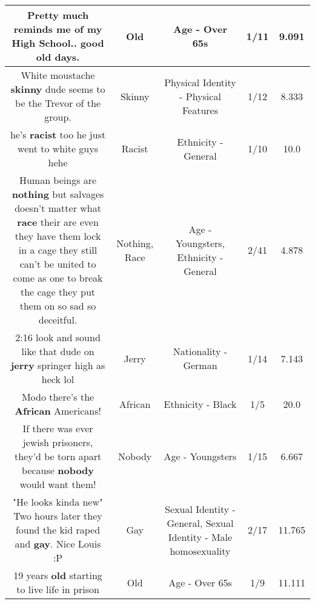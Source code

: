 \documentclass[11pt]{article}
\newlength\mylength
\begin{document}
\begin{center}
\begin{longtable}{|C{.65\mylength}|C{.30\mylength}|C{.12\mylength}|C{.12\mylength}|C{.12\mylength}|}
  \small Pretty much reminds me of my High School.. good \textbf{old} days.\normalsize   & Old & Age - Over 65s & 1/11 & 9.091 \\  \hline
  \small White moustache \textbf{skinny} dude seems to be the Trevor of the group.\normalsize   & Skinny & Physical Identity - Physical Features & 1/12 & 8.333 \\  \hline
  \small he's \textbf{racist} too he just went to white guys hehe\normalsize   & Racist & Ethnicity - General & 1/10 & 10.0 \\  \hline
  \small Human beings are \textbf{nothing} but salvages doesn't matter what \textbf{race} their are even they have them lock in a cage they still can't be united to come as one to break the cage they put them on so sad so deceitful.\normalsize   & Nothing, Race & Age - Youngsters, Ethnicity - General & 2/41 & 4.878 \\  \hline
  \small 2:16 look and sound like that dude on \textbf{jerry} springer high as heck lol\normalsize   & Jerry & Nationality - German & 1/14 & 7.143 \\  \hline
  \small Modo there's the \textbf{African} Americans!\normalsize   & African & Ethnicity - Black & 1/5 & 20.0 \\  \hline
  \small If there was ever jewish prisoners, they'd be torn apart because \textbf{nobody} would want them!\normalsize   & Nobody & Age - Youngsters & 1/15 & 6.667 \\  \hline
  \small "He looks kinda new" Two hours later they found the kid raped and \textbf{g\textbf{ay}}. Nice Louis :P\normalsize   & Gay & Sexual Identity - General, Sexual Identity - Male homosexuality & 2/17 & 11.765 \\  \hline
  \small 19 years \textbf{old} starting to live life in prison\normalsize   & Old & Age - Over 65s & 1/9 & 11.111 \\  \hline

\end{longtable}
\end{center}
\end{document}
